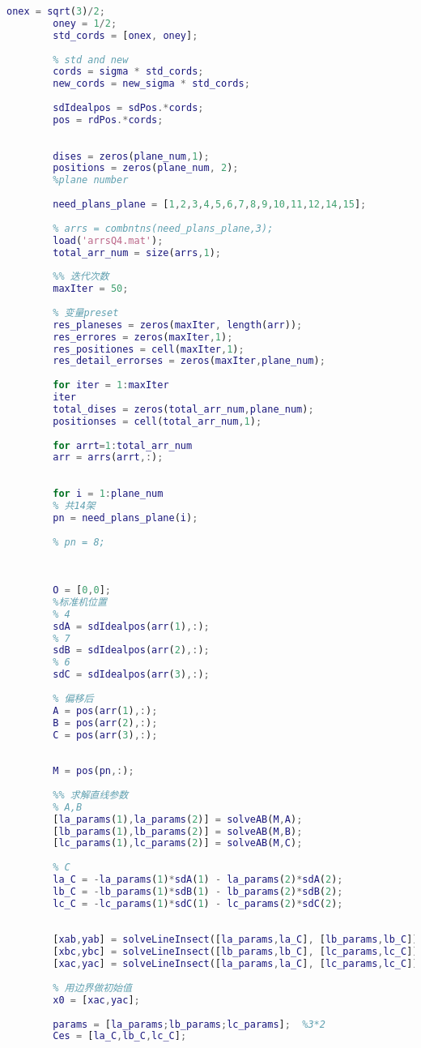 \documentclass{cumcmthesis}
\begin{document}
\begin{appendices}
\begin{lstlisting}[language=matlab]
		onex = sqrt(3)/2;
		oney = 1/2;
		std_cords = [onex, oney];
		
		% std and new
		cords = sigma * std_cords;
		new_cords = new_sigma * std_cords;
		
		sdIdealpos = sdPos.*cords;
		pos = rdPos.*cords;
		
		
		dises = zeros(plane_num,1);
		positions = zeros(plane_num, 2);
		%plane number
		
		need_plans_plane = [1,2,3,4,5,6,7,8,9,10,11,12,14,15];
		
		% arrs = combntns(need_plans_plane,3);
		load('arrsQ4.mat');
		total_arr_num = size(arrs,1);
		
		%% 迭代次数
		maxIter = 50;
		
		% 变量preset
		res_planeses = zeros(maxIter, length(arr));
		res_errores = zeros(maxIter,1);
		res_positiones = cell(maxIter,1);
		res_detail_errorses = zeros(maxIter,plane_num);
		
		for iter = 1:maxIter
		iter
		total_dises = zeros(total_arr_num,plane_num);
		positionses = cell(total_arr_num,1);
		
		for arrt=1:total_arr_num
		arr = arrs(arrt,:);
		
		
		for i = 1:plane_num
		% 共14架
		pn = need_plans_plane(i);
		
		% pn = 8;
		
		
		
		O = [0,0];
		%标准机位置
		% 4
		sdA = sdIdealpos(arr(1),:);
		% 7
		sdB = sdIdealpos(arr(2),:);
		% 6
		sdC = sdIdealpos(arr(3),:);
		
		% 偏移后
		A = pos(arr(1),:);
		B = pos(arr(2),:);
		C = pos(arr(3),:);
		
		
		M = pos(pn,:);
		
		%% 求解直线参数
		% A,B
		[la_params(1),la_params(2)] = solveAB(M,A);
		[lb_params(1),lb_params(2)] = solveAB(M,B);
		[lc_params(1),lc_params(2)] = solveAB(M,C);
		
		% C
		la_C = -la_params(1)*sdA(1) - la_params(2)*sdA(2);
		lb_C = -lb_params(1)*sdB(1) - lb_params(2)*sdB(2);
		lc_C = -lc_params(1)*sdC(1) - lc_params(2)*sdC(2);
		
		
		[xab,yab] = solveLineInsect([la_params,la_C], [lb_params,lb_C]);
		[xbc,ybc] = solveLineInsect([lb_params,lb_C], [lc_params,lc_C]);
		[xac,yac] = solveLineInsect([la_params,la_C], [lc_params,lc_C]);
		
		% 用边界做初始值
		x0 = [xac,yac];
		
		params = [la_params;lb_params;lc_params];  %3*2
		Ces = [la_C,lb_C,lc_C];
		

\end{lstlisting}
\end{appendices}
\end{document}
